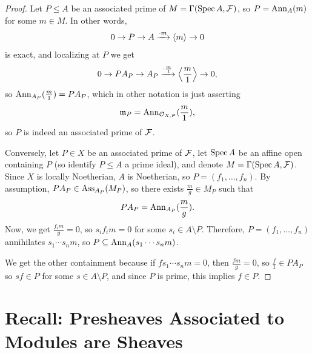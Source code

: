 \documentclass[12pt]{article}
\begin{document}
\begin{proof}
    Let $P\leq A$ be an associated prime of $M=\Gamma(\operatorname{Spec} A, \mathcal{F})$, so $P=\mathrm{Ann}_A(m)$ for some $m\in M$. In other words,
    \[0 \to P \to A\xrightarrow{\cdot m} \left\langle m\right\rangle \to 0\]
    is exact, and localizing at $P$ we get
    \[0 \to P A_P \to A_P\xrightarrow{\cdot \frac{m}{1}} \left\langle\frac{m}{1}\right\rangle \to 0,\]
    so $\mathrm{Ann}_{A_P}(\frac{m}{1}) = P A_P$, which in other notation is just asserting
    \[\mathfrak{m}_P = \mathrm{Ann}_{\mathcal{O}_{X,P}}(\frac{m}{1}),\]
    so $P$ is indeed an associated prime of $\mathcal{F}$.
    
    Conversely, let $P\in X$ be an associated prime of $\mathcal{F}$, let $\operatorname{Spec} A$ be an affine open containing $P$ (so identify $P\leq A$ a prime ideal), and denote $M=\Gamma(\operatorname{Spec} A, \mathcal{F})$. Since $X$ is locally Noetherian, $A$ is Noetherian, so $P=(f_1,\dots,f_n)$. By assumption, $PA_P \in \operatorname{Ass}_{A_P}(M_P)$, so there exists $\frac{m}{g}\in M_P$ such that
    \[PA_P = \mathrm{Ann}_{A_P}(\frac{m}{g}).\]
    Now, we get $\frac{f_i m}{g} = 0$, so $s_i f_i m = 0$ for some $s_i \in A\setminus P$. Therefore, $P=(f_1,\dots,f_n)$ annihilates $s_1\cdots s_n m$, so $P \subseteq \mathrm{Ann}_A(s_1\cdots s_n m)$. 
    
    We get the other containment because if $fs_1\cdots s_n m = 0$, then $\frac{fm}{g}=0$, so $\frac{f}{1} \in PA_P$ so $sf \in P$ for some $s\in A\setminus P$, and since $P$ is prime, this implies $f\in P$.
\end{proof}

\section{Recall: Presheaves Associated to Modules are Sheaves}
\end{document}
